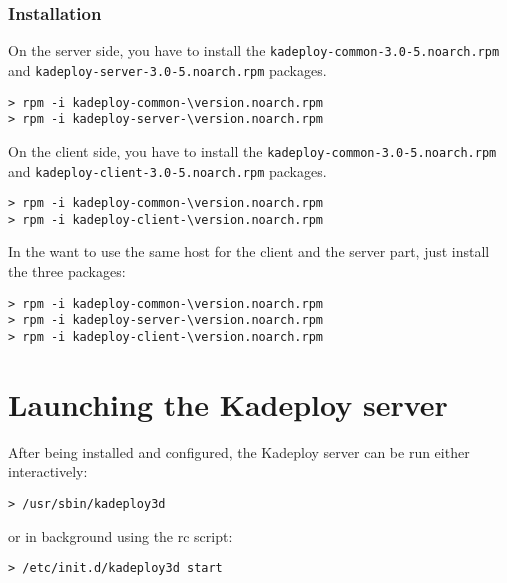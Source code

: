 \documentclass[a4wide,10pt,oneside]{book}
\newcommand{\version}{3.0-5}
\begin{document}
\subsubsection{Installation}
\noindent On the server side, you have to install the \texttt{kadeploy-common-\version.noarch.rpm} and \texttt{kadeploy-server-\version.noarch.rpm} packages.
\begin{small}
\begin{Verbatim}[commandchars=\\\{\}]
> rpm -i kadeploy-common-\version.noarch.rpm
> rpm -i kadeploy-server-\version.noarch.rpm
\end{Verbatim}
\end{small}

\noindent On the client side, you have to install the \texttt{kadeploy-common-\version.noarch.rpm} and \texttt{kadeploy-client-\version.noarch.rpm} packages.
\begin{small}
\begin{Verbatim}[commandchars=\\\{\}]
> rpm -i kadeploy-common-\version.noarch.rpm
> rpm -i kadeploy-client-\version.noarch.rpm
\end{Verbatim}
\end{small}

\noindent In the want to use the same host for the client and the server part, just install the three packages:
\begin{small}
\begin{Verbatim}[commandchars=\\\{\}]
> rpm -i kadeploy-common-\version.noarch.rpm
> rpm -i kadeploy-server-\version.noarch.rpm
> rpm -i kadeploy-client-\version.noarch.rpm
\end{Verbatim}
\end{small}


\section{Launching the Kadeploy server}
After being installed and configured, the Kadeploy server can be run either interactively:
\begin{small}
\begin{verbatim}
> /usr/sbin/kadeploy3d
\end{verbatim}
\end{small}
\noindent or in background using the rc script:
\begin{small}
\begin{verbatim}
> /etc/init.d/kadeploy3d start
\end{verbatim}
\end{small}
\end{document}
